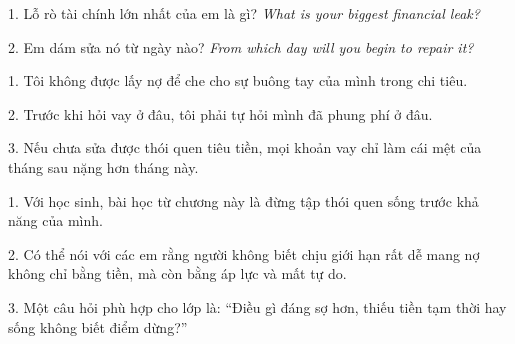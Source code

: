 \begin{tuhocnhanh}
1. Lỗ rò tài chính lớn nhất của em là gì? \textit{What is your biggest financial leak?}

2. Em dám sửa nó từ ngày nào? \textit{From which day will you begin to repair it?}
\end{tuhocnhanh}

\begin{turanminh}
1. Tôi không được lấy nợ để che cho sự buông tay của mình trong chi tiêu.

2. Trước khi hỏi vay ở đâu, tôi phải tự hỏi mình đã phung phí ở đâu.

3. Nếu chưa sửa được thói quen tiêu tiền, mọi khoản vay chỉ làm cái mệt của tháng sau nặng hơn tháng này.
\end{turanminh}

\begin{dayhoc}
1. Với học sinh, bài học từ chương này là đừng tập thói quen sống trước khả năng của mình.

2. Có thể nói với các em rằng người không biết chịu giới hạn rất dễ mang nợ không chỉ bằng tiền, mà còn bằng áp lực và mất tự do.

3. Một câu hỏi phù hợp cho lớp là: ``Điều gì đáng sợ hơn, thiếu tiền tạm thời hay sống không biết điểm dừng?''
\end{dayhoc}